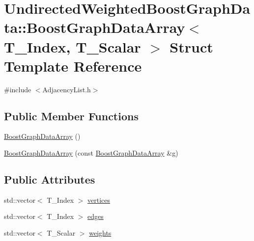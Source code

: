 \hypertarget{struct_undirected_weighted_graph_1_1_graph_array}{\section{Undirected\+Weighted\+BoostGraphData\+:\+:BoostGraphData\+Array$<$ T\+\_\+\+Index, T\+\_\+\+Scalar $>$ Struct Template Reference}
\label{struct_undirected_weighted_graph_1_1_graph_array}
}


{\ttfamily \#include $<$Adjacency\+List.\+h$>$}

\subsection*{Public Member Functions}
\begin{DoxyCompactItemize}
\item 
\hyperlink{struct_undirected_weighted_graph_1_1_graph_array_ad834e9b82b6494bc2bb23adff3a93bca}{BoostGraphData\+Array} ()
\item 
\hyperlink{struct_undirected_weighted_graph_1_1_graph_array_ae62dad780617d9c56c8cf16274f53d07}{BoostGraphData\+Array} (const \hyperlink{struct_undirected_weighted_graph_1_1_graph_array}{BoostGraphData\+Array} \&g)
\end{DoxyCompactItemize}
\subsection*{Public Attributes}
\begin{DoxyCompactItemize}
\item 
std\+::vector$<$ T\+\_\+\+Index $>$ \hyperlink{struct_undirected_weighted_graph_1_1_graph_array_a81fa36cd9facc14c41f4fcccde694f15}{vertices}
\item 
std\+::vector$<$ T\+\_\+\+Index $>$ \hyperlink{struct_undirected_weighted_graph_1_1_graph_array_ae11fa2a6dad43302b76d8c0c3cd43b8e}{edges}
\item 
std\+::vector$<$ T\+\_\+\+Scalar $>$ \hyperlink{struct_undirected_weighted_graph_1_1_graph_array_a56c78312ffe5c1948aeaf930cbb61fb3}{weights}
\end{DoxyCompactItemize}


